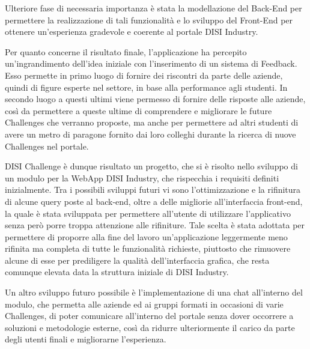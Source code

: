 Ulteriore fase di necessaria importanza è stata la modellazione del Back-End per permettere la realizzazione di tali funzionalità e lo sviluppo del Front-End per ottenere un'esperienza gradevole e coerente al portale DISI Industry.

Per quanto concerne il risultato finale, l'applicazione ha percepito un'ingrandimento dell'idea iniziale con l'inserimento di un sistema di Feedback. Esso permette in primo luogo di fornire dei riscontri da parte delle aziende, quindi di figure esperte nel settore, in base alla performance agli studenti. In secondo luogo a questi ultimi viene permesso di fornire delle risposte alle aziende, così da permettere a queste ultime di comprendere e migliorare le future Challenges che verranno proposte, ma anche per permettere ad altri studenti di avere un metro di paragone fornito dai loro colleghi durante la ricerca di nuove Challenges nel portale.

DISI Challenge è dunque risultato un progetto, che si è risolto nello sviluppo di un modulo per la WebApp DISI Industry, che rispecchia i requisiti definiti inizialmente. Tra i possibili sviluppi futuri vi sono l'ottimizzazione e la rifinitura di alcune query poste al back-end, oltre a delle migliorie all'interfaccia front-end, la quale è stata sviluppata per permettere all'utente di utilizzare l'applicativo senza però porre troppa attenzione alle rifiniture. Tale scelta è stata adottata per permettere di proporre alla fine del lavoro un'applicazione leggermente meno rifinita ma completa di tutte le funzionalità richieste, piuttosto che rimuovere alcune di esse per prediligere la qualità dell'interfaccia grafica, che resta comunque elevata data la struttura iniziale di DISI Industry.

Un altro sviluppo futuro possibile è l'implementazione di una chat all'interno del modulo, che permetta alle aziende ed ai gruppi formati in occasioni di varie Challenges, di poter comunicare all'interno del portale senza dover occorrere a soluzioni e metodologie esterne, così da ridurre ulteriormente il carico da parte degli utenti finali e migliorarne l'esperienza.
